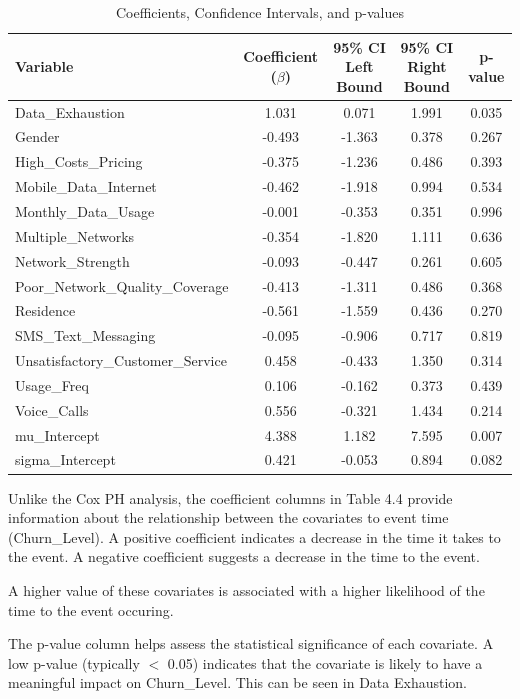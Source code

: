 \documentclass[doublespacing]{report} %
\begin{document}
\begin{table}[H]
\centering
\caption{Coefficients, Confidence Intervals, and p-values}
\begin{tabular}{lcccc}
\hline
Variable & Coefficient ($\beta$) & 95\% CI Left Bound & 95\% CI Right Bound & p-value \\
\hline
Data\_Exhaustion & 1.031 & 0.071 & 1.991 & 0.035 \\
Gender & -0.493 & -1.363 & 0.378 & 0.267 \\
High\_Costs\_Pricing & -0.375 & -1.236 & 0.486 & 0.393 \\
Mobile\_Data\_Internet & -0.462 & -1.918 & 0.994 & 0.534 \\
Monthly\_Data\_Usage & -0.001 & -0.353 & 0.351 & 0.996 \\
Multiple\_Networks & -0.354 & -1.820 & 1.111 & 0.636 \\
Network\_Strength & -0.093 & -0.447 & 0.261 & 0.605 \\
Poor\_Network\_Quality\_Coverage & -0.413 & -1.311 & 0.486 & 0.368 \\
Residence & -0.561 & -1.559 & 0.436 & 0.270 \\
SMS\_Text\_Messaging & -0.095 & -0.906 & 0.717 & 0.819 \\
Unsatisfactory\_Customer\_Service & 0.458 & -0.433 & 1.350 & 0.314 \\
Usage\_Freq & 0.106 & -0.162 & 0.373 & 0.439 \\
Voice\_Calls & 0.556 & -0.321 & 1.434 & 0.214 \\
mu\_Intercept & 4.388 & 1.182 & 7.595 & 0.007 \\
sigma\_Intercept & 0.421 & -0.053 & 0.894 & 0.082 \\
\hline
\end{tabular}
\label{tab:LogNormal Coefficeints}
\end{table}

Unlike the Cox PH analysis, the coefficient columns in Table 4.4 provide information about the relationship between the covariates to event time (Churn_Level). A positive coefficient indicates a decrease in the time it takes to the event. A negative coefficient suggests a decrease in the time to the event. 

 A higher value of these covariates is associated with a higher likelihood of the time to the event occuring.
 
The p-value column helps assess the statistical significance of each covariate. A low p-value (typically  \(< \) 0.05) indicates that the covariate is likely to have a meaningful impact on Churn_Level. This can be seen in Data Exhaustion.
\end{document}
